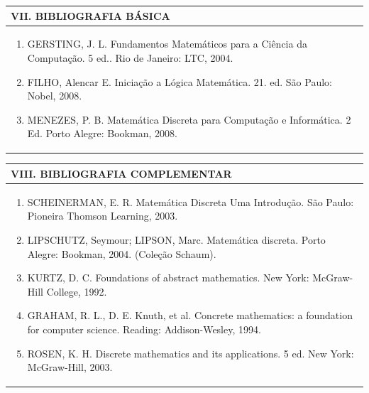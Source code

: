 \documentclass[12pt]{article}
\begin{document}
\begin{longtable}{|L{1.025\textwidth}|} \hline
%
{\bf VII. BIBLIOGRAFIA BÁSICA} \\ \hline
\begin{enumerate}
%
\item GERSTING, J. L. Fundamentos Matemáticos para a Ciência da Computação. 5 ed.. Rio de Janeiro: LTC, 2004. 
\item FILHO, Alencar E. Iniciação a Lógica Matemática. 21. ed. São Paulo: Nobel, 2008. 
\item MENEZES, P. B. Matemática Discreta para Computação e Informática. 2 Ed. Porto Alegre: Bookman, 2008.

%

\end{enumerate}
 \\ \hline
\end{longtable}



\begin{longtable}{|L{1.025\textwidth}|} \hline
%
{\bf VIII. BIBLIOGRAFIA COMPLEMENTAR} \\ \hline
\begin{enumerate}

\item SCHEINERMAN, E. R. Matemática Discreta Uma Introdução. São Paulo: Pioneira Thomson Learning, 2003. 
\item LIPSCHUTZ, Seymour; LIPSON, Marc. Matemática discreta. Porto Alegre: Bookman, 2004. (Coleção Schaum). 
\item KURTZ, D. C. Foundations of abstract mathematics. New York: McGraw-Hill College, 1992.
\item GRAHAM, R. L., D. E. Knuth, et al. Concrete mathematics: a foundation for computer science. Reading: Addison-Wesley, 1994. 
\item ROSEN, K. H. Discrete mathematics and its applications. 5 ed. New York: McGraw-Hill, 2003.


%
\end{enumerate}
 \\ \hline
\end{longtable}



\end{document}
